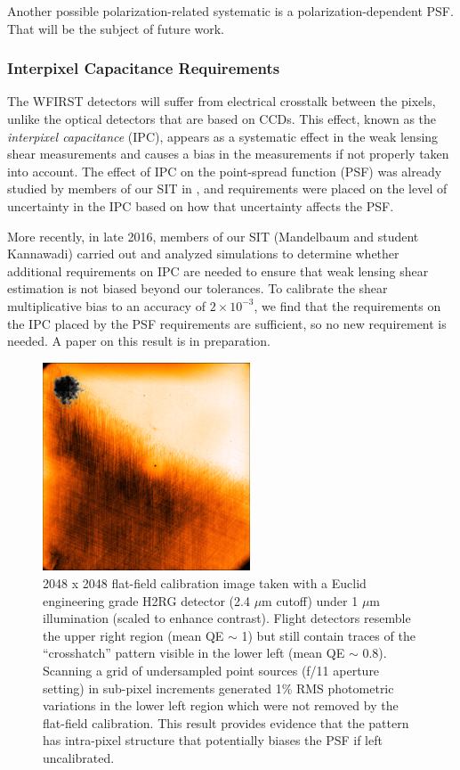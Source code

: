 Another possible polarization-related systematic is a polarization-dependent PSF.  That will be the
subject of future work.

\subsubsection{Interpixel Capacitance Requirements}

The WFIRST detectors will suffer from electrical crosstalk between the pixels, unlike the optical
 detectors that are based on CCDs. This effect, known as the \emph{interpixel capacitance} (IPC),
 appears as a systematic effect in the weak lensing shear measurements and causes a
 bias in the measurements if not properly taken into account. The effect of IPC on the point-spread
 function (PSF) was already studied by members of our SIT in \cite{Kannawadi2016}, and requirements were placed
 on the level of uncertainty in the IPC based on how that uncertainty affects the PSF.

More recently, in late 2016, members of our SIT (Mandelbaum and student Kannawadi) carried out and
analyzed simulations to determine whether additional requirements on IPC are needed to ensure that
weak lensing shear estimation is not biased beyond our tolerances.  To calibrate the shear
multiplicative bias to an accuracy of $2\times 10^{-3}$, we find that the requirements on the IPC
placed by the PSF requirements are sufficient, so no new requirement is needed.  A paper on this
result is in preparation.


\begin{figure}[!t]
  \includegraphics[width=0.55\textwidth]{Plots/Euclid_flat_crosshatch.png}
\caption{\label{fig:crosshatch}2048 x 2048 flat-field calibration image taken with a Euclid engineering grade H2RG detector (2.4 $\mu$m cutoff) under 1 $\mu$m illumination (scaled to enhance contrast).  Flight detectors resemble the upper right region (mean QE $\sim$ 1) but still contain traces of the ``crosshatch'' pattern visible in the lower left (mean QE $\sim$ 0.8).  Scanning a grid of undersampled point sources (f/11 aperture setting) in sub-pixel increments generated 1\% RMS photometric variations in the lower left region which were not removed by the flat-field calibration.  This result provides evidence that the pattern has intra-pixel structure that potentially biases the PSF if left uncalibrated.}
\end{figure}

